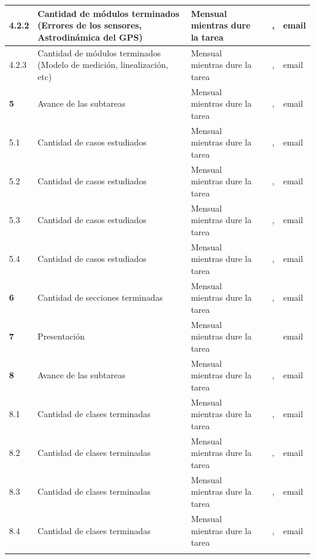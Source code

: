 \documentclass[11pt]{charter}
\begin{document}
\begin{longtable}{|m{1cm}|m{3.5cm}|m{2.2cm}|m{2cm}|m{3cm}|m{1.5cm}|}
4.2.2						& Cantidad de módulos terminados (Errores de los sensores, Astrodinámica del GPS)  & Mensual mientras dure la tarea & \authorname & \clientename, \supname & email \\ \hline
4.2.3						& Cantidad de módulos terminados (Modelo de medición, linealización, etc) & Mensual mientras dure la tarea & \authorname & \clientename, \supname & email \\ \hline
\rowcolor{lightgray!50}
\textbf{5}					& Avance de las subtareas  & Mensual mientras dure la tarea & \authorname & \clientename, \supname & email \\ \hline
5.1							& Cantidad de casos estudiados  & Mensual mientras dure la tarea & \authorname & \clientename, \supname & email \\ \hline
5.2							& Cantidad de casos estudiados  & Mensual mientras dure la tarea & \authorname & \clientename, \supname & email \\ \hline
5.3							& Cantidad de casos estudiados  & Mensual mientras dure la tarea & \authorname & \clientename, \supname & email \\ \hline
5.4							& Cantidad de casos estudiados  & Mensual mientras dure la tarea & \authorname & \clientename, \supname & email \\ \hline
\rowcolor{lightgray!50}
\textbf{6}					& Cantidad de secciones terminadas  & Mensual mientras dure la tarea & \authorname & \clientename, \supname & email \\ \hline
\rowcolor{lightgray!50}		
\textbf{7}					& Presentación  & Mensual mientras dure la tarea & \authorname & \clientename & email \\ \hline
\rowcolor{lightgray!50}
\textbf{8}					& Avance de las subtareas  & Mensual mientras dure la tarea & \authorname & \clientename, \supname & email \\ \hline
8.1							& Cantidad de clases terminadas  & Mensual mientras dure la tarea & \authorname & \clientename, \supname & email \\ \hline
8.2							& Cantidad de clases terminadas  & Mensual mientras dure la tarea & \authorname & \clientename, \supname & email \\ \hline
8.3							& Cantidad de clases terminadas  & Mensual mientras dure la tarea & \authorname & \clientename, \supname & email \\ \hline
8.4							& Cantidad de clases terminadas  & Mensual mientras dure la tarea & \authorname & \clientename, \supname & email \\ \hline
\rowcolor{lightgray!50}

\end{longtable}
\end{document}
